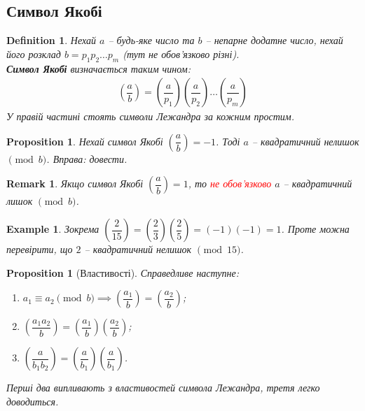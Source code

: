 \documentclass[a4paper, 10pt]{article}
\theoremstyle{theoremdd}
\theoremstyle{theoremdd}
\newtheorem{definition}[theorem]{Definition}
\theoremstyle{theoremdd}
\theoremstyle{theoremdd}
\newtheorem{example}[theorem]{Example}
\theoremstyle{theoremdd}
\newtheorem{proposition}[theorem]{Proposition}
\theoremstyle{theoremdd}
\newtheorem{remark}[theorem]{Remark}
\theoremstyle{theoremdd}
\theoremstyle{theoremdd}
\begin{document}
\subsection{Символ Якобі}
\begin{definition}
Нехай $a$ -- будь-яке число та $b$ -- непарне додатне число, нехай його розклад $b = p_1 p_2 \dots p_m$ (тут не обов'язково різні).\\
\textbf{Символ Якобі} визначається таким чином:
\begin{align*}
\left( \dfrac{a}{b} \right) = \left( \dfrac{a}{p_1} \right) \left( \dfrac{a}{p_2} \right) \dots \left( \dfrac{a}{p_m} \right)
\end{align*}
У правій частині стоять символи Лежандра за кожним простим.
\end{definition}

\begin{proposition}
Нехай символ Якобі $\left( \dfrac{a}{b} \right) = -1$. Тоді $a$ -- квадратичний нелишок $\!\! \pmod b$.
\textit{Вправа: довести.}
\end{proposition}

\begin{remark}
Якщо символ Якобі $\left( \dfrac{a}{b} \right) = 1$, то \textcolor{red}{не обов'язково} $a$ -- квадратичний лишок $\!\! \pmod b$.
\end{remark}

\begin{example}
Зокрема $\left( \dfrac{2}{15} \right) = \left( \dfrac{2}{3} \right) \left( \dfrac{2}{5} \right) = (-1)(-1) = 1$. Проте можна перевірити, що $2$ -- квадратичний нелишок $\!\! \pmod {15}$.
\end{example}

\begin{proposition}[Властивості]
Справедливе наступне:
\begin{enumerate}[nosep,wide=0pt,label={\arabic*)}]
\item $a_1 \equiv a_2 \pmod b \implies \left( \dfrac{a_1}{b} \right) = \left( \dfrac{a_2}{b} \right)$;
\item $\left( \dfrac{a_1 a_2}{b} \right) = \left( \dfrac{a_1}{b} \right) \left( \dfrac{a_2}{b} \right)$;
\item $\left( \dfrac{a}{b_1 b_2} \right) = \left( \dfrac{a}{b_1}\right) \left( \dfrac{a}{b_1}\right)$.
\end{enumerate}
\textit{Перші два випливають з властивостей символа Лежандра, третя легко доводиться.}
\end{proposition}
\end{document}
